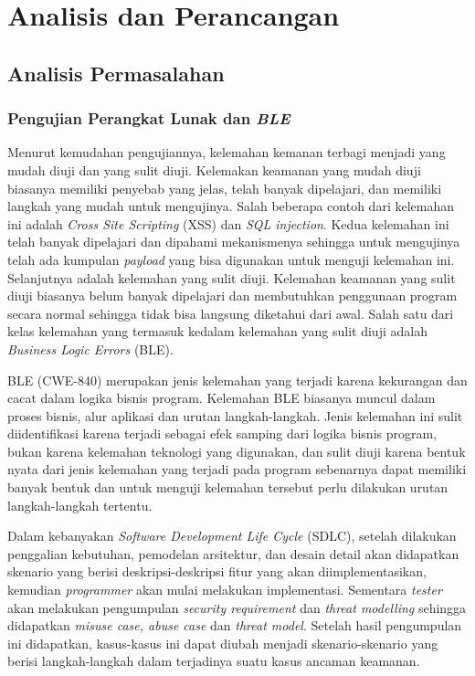 \chapter{Analisis dan Perancangan}

\section{Analisis Permasalahan}

\subsection{Pengujian Perangkat Lunak dan \textit{BLE}}

Menurut kemudahan pengujiannya, kelemahan kemanan terbagi menjadi yang mudah diuji
dan yang sulit diuji. Kelemakan keamanan yang mudah diuji biasanya memiliki penyebab
yang jelas, telah banyak dipelajari, dan memiliki langkah yang mudah untuk mengujinya.
Salah beberapa contoh dari kelemahan ini adalah \emph{Cross Site Scripting} (XSS) dan
\emph{SQL injection}. Kedua kelemahan ini telah banyak dipelajari dan dipahami mekanismenya
sehingga untuk mengujinya telah ada kumpulan \emph{payload} yang bisa digunakan untuk menguji
kelemahan ini. Selanjutnya adalah kelemahan yang sulit diuji. Kelemahan keamanan
yang sulit diuji biasanya belum banyak dipelajari dan membutuhkan penggunaan program
secara normal sehingga tidak bisa langsung diketahui dari awal. Salah satu
dari kelas kelemahan yang termasuk kedalam kelemahan yang sulit diuji adalah
\emph{Business Logic Errors} (BLE).

BLE (CWE-840) merupakan jenis kelemahan yang terjadi karena kekurangan
dan cacat dalam logika bisnis program. Kelemahan BLE biasanya muncul dalam proses bisnis,
alur aplikasi dan urutan langkah-langkah. Jenis kelemahan ini sulit diidentifikasi karena
terjadi sebagai efek samping dari logika bisnis program, bukan karena kelemahan teknologi
yang digunakan, dan sulit diuji karena bentuk nyata dari jenis kelemahan yang terjadi
pada program sebenarnya dapat memiliki banyak bentuk dan untuk menguji kelemahan tersebut
perlu dilakukan urutan langkah-langkah tertentu.

Dalam kebanyakan \textit{Software Development Life Cycle} (SDLC), setelah dilakukan
penggalian kebutuhan, pemodelan arsitektur, dan desain detail akan didapatkan
skenario yang berisi deskripsi-deskripsi fitur yang akan diimplementasikan,
kemudian \emph{programmer} akan mulai melakukan implementasi.
Sementara \emph{tester} akan melakukan
pengumpulan \emph{security requirement} dan \emph{threat modelling} sehingga didapatkan
\emph{misuse case, abuse case} dan \emph{threat model}. Setelah hasil pengumpulan ini
didapatkan, kasus-kasus ini dapat diubah menjadi skenario-skenario yang berisi
langkah-langkah dalam terjadinya suatu kasus ancaman keamanan.

